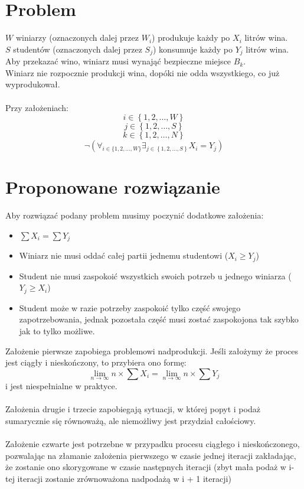 \documentclass[12pt, a4paper, twoside]{article}
\begin{document}
\section*{Problem}

$ W $ winiarzy (oznaczonych dalej przez $ W_{i} $) produkuje każdy po $ X_{i} $ litrów wina.\\
$ S $ studentów (oznaczonych dalej przez $ S_{j} $) konsumuje każdy po $ Y_{j} $ litrów wina.\\
Aby przekazać wino, winiarz musi wynająć bezpieczne miejsce $ B_{k} $.\\
Winiarz nie rozpocznie produkcji wina, dopóki nie odda wszystkiego, co już wyprodukował.\\
\\
Przy założeniach:
$$ i \in \left\{1, 2, \ldots, W\right\} $$
$$ j \in \left\{1, 2, \ldots, S\right\} $$
$$ k \in \left\{1, 2, \ldots, N\right\} $$
$$ \neg (\forall_{i \in \{1, 2, \ldots, W\}} \exists_{j \in \left\{1, 2, \ldots, S\right\}} X_{i} = Y_{j}) $$

\section*{Proponowane rozwiązanie}

Aby rozwiązać podany problem musimy poczynić dodatkowe założenia:

\begin{itemize}
    \item $ \sum X_{i} = \sum Y_{j} $
    \item Winiarz nie musi oddać całej partii jednemu studentowi ($ X_{i} \geq Y_{j} $)
    \item Student nie musi zaspokoić wszystkich swoich potrzeb u jednego winiarza ($ Y_{j} \geq X_{i} $)
    \item Student może w razie potrzeby zaspokoić tylko część swojego zapotrzebowania, jednak pozostała część musi zostać zaspokojona tak szybko jak to tylko możliwe. 
\end{itemize}

Założenie pierwsze zapobiega problemowi nadprodukcji. Jeśli założymy że proces jest ciągły i nieskończony, to przybiera ono formę:
\begin{equation*}
    \lim_{n \to \infty}{n \times \sum X_{i}} = \lim_{n \to \infty}{n \times \sum Y_{j}}
\end{equation*}
i jest niespełnialne w praktyce.\\
\\
Założenia drugie i trzecie zapobiegają sytuacji, w której popyt i podaż sumarycznie się równoważą, ale niemożliwy jest przydział całościowy.\\
\\
Założenie czwarte jest potrzebne w przypadku procesu ciągłego i nieskończonego, pozwalając na złamanie założenia pierwszego w czasie jednej iteracji
zakładając, że zostanie ono skorygowane w czasie następnych iteracji (zbyt mała podaż w i-tej iteracji zostanie zrównoważona nadpodażą w  i + 1 iteracji)
\end{document}

